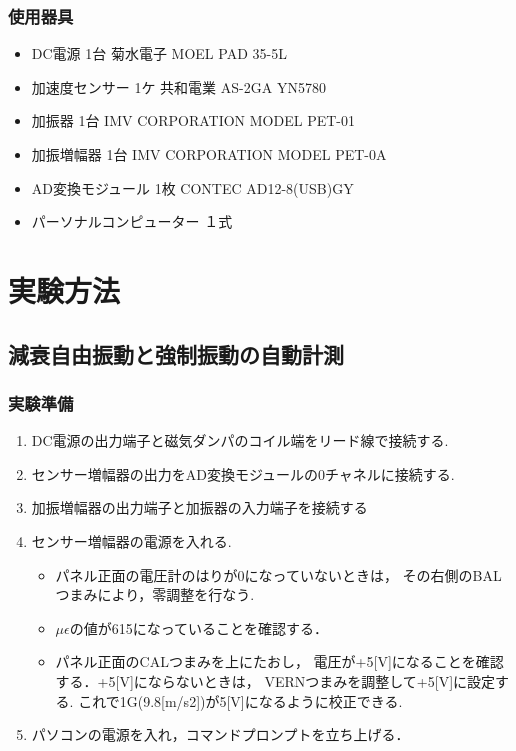 \documentclass[a4paper,10.5pt]{jsarticle}
\begin{document}
\subsubsection{使用器具}
\begin{itemize}
  \item DC電源  1台  菊水電子  MOEL PAD 35-5L
  \item 加速度センサー  1ケ  共和電業  AS-2GA YN5780
  \item 加振器  1台  IMV CORPORATION  MODEL PET-01
  \item 加振増幅器  1台  IMV CORPORATION  MODEL PET-0A
  \item AD変換モジュール  1枚  CONTEC  AD12-8(USB)GY
  \item パーソナルコンピューター  １式
\end{itemize}

\section{実験方法}
\subsection{減衰自由振動と強制振動の自動計測}
\subsubsection{実験準備}
\begin{enumerate}
  \item DC電源の出力端子と磁気ダンパのコイル端をリード線で接続する.
  \item センサー増幅器の出力をAD変換モジュールの0チャネルに接続する.
  \item 加振増幅器の出力端子と加振器の入力端子を接続する
  \item センサー増幅器の電源を入れる.
  \begin{itemize}
    \item パネル正面の電圧計のはりが0になっていないときは，
    その右側のBALつまみにより，零調整を行なう.
    \item $μ\epsilon$の値が615になっていることを確認する．
    \item パネル正面のCALつまみを上にたおし，
    電圧が+5[V]になることを確認する．+5[V]にならないときは，
    VERNつまみを調整して+5[V]に設定する.
    これで1G(9.8[m/s2])が5[V]になるように校正できる.
  \end{itemize}
  \item パソコンの電源を入れ，コマンドプロンプトを立ち上げる．
\end{enumerate}
\end{document}
